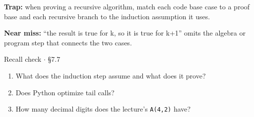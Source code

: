 \documentclass[11pt]{article}
\begin{document}
\begin{keepsection}
\begin{notebox}\textbf{Trap:} when proving a recursive algorithm, match each code base case to a proof base and each recursive branch to the induction assumption it uses.\end{notebox}

\begin{notebox}\textbf{Near miss:} “the result is true for k, so it is true for k+1” omits the algebra or program step that connects the two cases.\end{notebox}

\begin{recallbox}{Recall check \ensuremath{\cdot} §7.7}
\begin{enumerate}
\item What does the induction step assume and what does it prove?
\item Does Python optimize tail calls?
\item How many decimal digits does the lecture’s \texttt{A(4,2)} have?
\end{enumerate}

\end{recallbox}
\end{keepsection}
\end{document}
